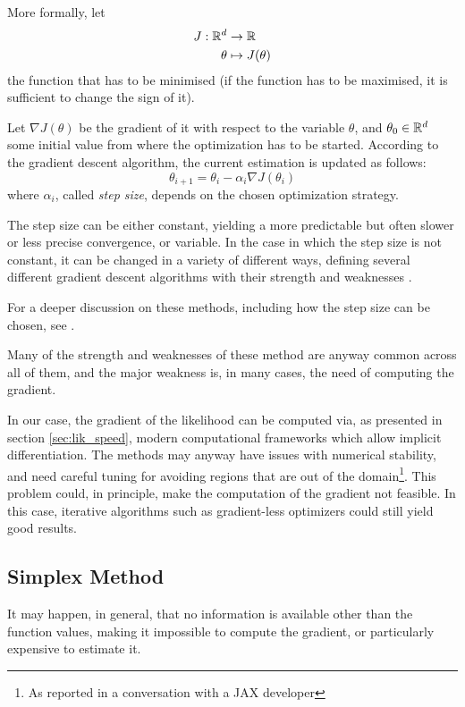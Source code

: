 More formally, let
\begin{align*}
  J: \mathbb{R}^d & \rightarrow \mathbb{R} \\
  \theta & \mapsto J(\theta)
\end{align*}
the function that has to be minimised
(if the function has to be maximised, it is sufficient to change the sign of it).

Let \(\nabla J(\theta)\) be the gradient of it with respect to the variable \(\theta\),
and \(\theta_0 \in \mathbb{R}^d\) some initial value from where the optimization has to be started.
According to the gradient descent algorithm,
the current estimation is updated as follows:
\begin{equation}
  \label{eq:grad_desc}
  \theta_{i+1} = \theta_i - \alpha_i\nabla J(\theta_i)
\end{equation}
where \(\alpha_i\), called \textit{step size}, depends on the chosen optimization strategy.

The step size can be either constant, yielding a more predictable but often slower or less precise convergence,
or variable.
In the case in which the step size is not constant,
it can be changed in a variety of different ways,
defining several different gradient descent algorithms with their strength and weaknesses
\parencite{doi:10.1137/1011036,MR701288}.

For a deeper discussion on these methods, including how the step size can be chosen,
see \cite{10.5555/3317111}.

Many of the strength and weaknesses of these method are anyway common across all of them,
and the major weakness is, in many cases,
the need of computing the gradient.

In our case, the gradient of the likelihood can be computed via, as presented in section \ref{sec:lik_speed},
modern computational frameworks which allow implicit differentiation.
The methods may anyway have issues with numerical stability,
and need careful tuning for avoiding regions that are out of the domain\footnote{As reported in a conversation with a JAX developer}.
This problem could, in principle,
make the computation of the gradient not feasible.
In this case, iterative algorithms such as gradient-less optimizers could still yield good results.

\subsection{Simplex Method}
\label{sec:no_grad_opt}

It may happen, in general, that no information is available other than the function values,
making it impossible to compute the gradient,
or particularly expensive to estimate it.

